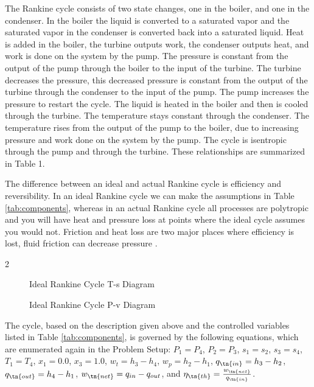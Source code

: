 \documentclass[12pt, letterpaper]{article}
\begin{document}
The Rankine cycle consists of two state changes, one in the boiler, and one in the condenser. In the boiler the liquid is converted to a saturated vapor and the saturated vapor in the condenser is converted back into a saturated liquid. Heat is added in the boiler, the turbine outputs work, the condenser outputs heat, and work is done on the system by the pump. The pressure is constant from the output of the pump through the boiler to the input of the turbine. The turbine decreases the pressure, this decreased pressure is constant from the output of the turbine through the condenser to the input of the pump. The pump increases the pressure to restart the cycle. The liquid is heated in the boiler and then is cooled through the turbine. The temperature stays constant through the condenser. The temperature rises from the output of the pump to the boiler, due to increasing pressure and work done on the system by the pump. The cycle is isentropic through the pump and through the turbine. These relationships are summarized in Table 1.

The difference between an ideal and actual Rankine cycle is efficiency and reversibility. In an ideal Rankine cycle we can make the assumptions in Table \ref{tab:components}, whereas in an actual Rankine cycle all processes are polytropic and you will have heat and pressure loss at points where the ideal cycle assumes you would not. Friction and heat loss are two major places where efficiency is lost, fluid friction can decrease pressure \cite{E4U}.

\begin{multicols}{2}
  \begin{figure}[H]
  \centering
  \tsDiagram
  \caption{Ideal Rankine Cycle T-s Diagram}
  \label{fig:ts}
\end{figure}
\columnbreak
\begin{figure}[H]
  \centering
  \pvDiagram
  \caption{Ideal Rankine Cycle P-v Diagram}
  \label{fig:pv}
\end{figure}
\end{multicols}

The cycle, based on the description given above and the controlled variables listed in Table \ref{tab:components}, is governed by the following equations, which are enumerated again in the Problem Setup:
$P_1 = P_4$,
$P_2 = P_3$,
$s_1 = s_2$,
$s_3 = s_4$,
$T_1 = T_4$,
$x_1 = 0.0$,
$x_3 = 1.0$,
$w_t = h_3-h_4$, 
$w_p = h_2-h_1$, 
$q_{\tn{in}} = h_3-h_2$, 
$q_{\tn{out}} = h_4-h_1$, 
$w_{\tn{net}} = q_{in}-q_{out}$, and
$\eta_{\tn{th}} = \frac{w_{\tn{net}}}{q_{\tn{in}}}$.
\end{document}
